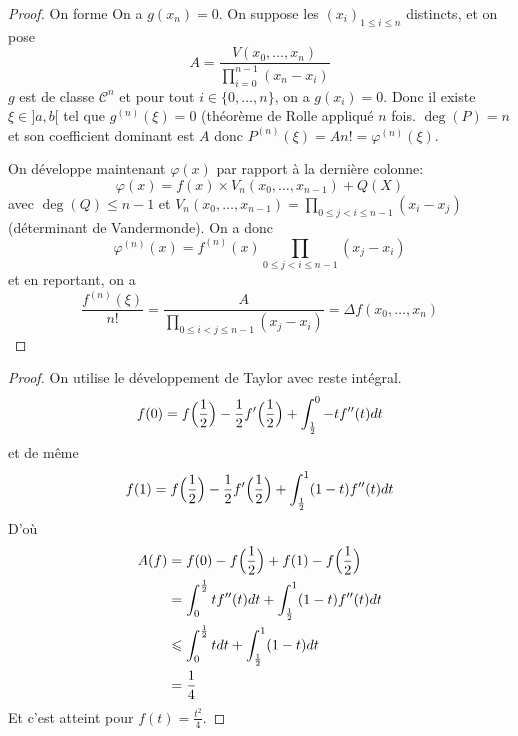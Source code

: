 \documentclass[12pt]{article}
\begin{document}
\begin{proof}
	On forme 
	On a $g(x_{n})=0$. On suppose les $(x_{i})_{1\leqslant i\leqslant n}$ distincts, et on pose 
	\begin{equation}A=\frac{V(x_{0},\dots,x_{n})}{\prod_{i=0}^{n-1}(x_{n}-x_{i})}\end{equation}
	$g$ est de classe $\mathcal{C}^{n}$ et pour tout $i\in\{0,\dots,n\}$, on a $g(x_{i})=0$.
	Donc il existe $\xi\in]a,b[$ tel que $g^{(n)}(\xi)=0$ (théorème de Rolle appliqué $n$ fois. $\deg(P)=n$ et son coefficient dominant est $A$ donc $P^{(n)}(\xi)=An!=\varphi^{(n)}(\xi)$.

	On développe maintenant $\varphi(x)$ par rapport à la dernière colonne:
	\begin{equation}\varphi(x)=f(x)\times V_{n}(x_{0},\dots,x_{n-1})+Q(X)\end{equation}
	avec $\deg(Q)\leqslant n-1$ et $V_{n}(x_{0},\dots,x_{n-1})=\prod_{0\leqslant j<i\leqslant n-1}(x_{i}-x_{j})$ (déterminant de Vandermonde). On a donc 
	\begin{equation}\varphi^{(n)}(x)=f^{(n)}(x)\prod_{0\leqslant j<i\leqslant n-1}(x_{j}-x_{i})\end{equation}
	et en reportant, on a 
	\begin{equation}\frac{f^{(n)}(\xi)}{n!}=\frac{A}{\prod_{0\leqslant i<j\leqslant n-1}(x_{j}-x_{i})}=\Delta f(x_{0},\dots,x_{n})\end{equation}
\end{proof}

\begin{proof}
	On utilise le développement de Taylor avec reste intégral.
	\begin{equation}f(0)=f\Bigl(\frac{1}{2}\Bigr)-\frac{1}{2}f'\Bigl(\frac{1}{2}\Bigr)+\int_{\frac{1}{2}}^{0}-tf''(t)dt\end{equation}
	et de même
	\begin{equation}f(1)=f\Bigl(\frac{1}{2}\Bigr)-\frac{1}{2}f'\Bigl(\frac{1}{2}\Bigr)+\int_{\frac{1}{2}}^{1}(1-t)f''(t)dt\end{equation}
	D'où
	\begin{align}
		A(f)
		&=f(0)-f\Bigl(\frac{1}{2}\Bigr)+f(1)-f\Bigl(\frac{1}{2}\Bigr)\\
		&=\int_{0}^{\frac{1}{2}}tf''(t)dt+\int_{\frac{1}{2}}^{1}(1-t)f''(t)dt\\
		&\leqslant\int_{0}^{\frac{1}{2}}tdt+\int_{\frac{1}{2}}^{1}(1-t)dt\\
		&=\frac{1}{4}
	\end{align}
	Et c'est atteint pour $f(t)=\frac{t^{2}}{4}$.
\end{proof}
\end{document}

